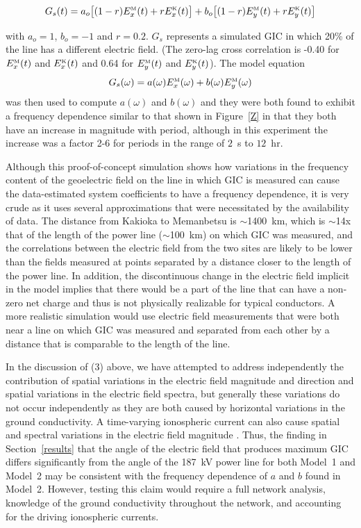 \documentclass[draft,linenumbers]{agujournal2018}
\begin{document}
\begin{equation}
  G_s(t)=a_o\big[(1-r)E^{\mbox{\tiny M}}_x(t) + rE^{\mbox{\tiny K}}_x(t)\big]+b_o\big[(1-r)E^{\mbox{\tiny M}}_y(t) + rE^{\mbox{\tiny K}}_y(t)\big]
\end{equation}

\noindent
with $a_o=1$, $b_o=-1$ and $r=0.2$. $G_s$ represents a simulated GIC in which 20\% of the line has a different electric field. (The zero-lag cross correlation is -0.40 for $E^{\mbox{\tiny M}}_x(t)$ and $E^{\mbox{\tiny K}}_x(t)$ and 0.64 for $E^{\mbox{\tiny M}}_y(t)$ and $E^{\mbox{\tiny K}}_y(t)$). The model equation
\begin{equation}
  G_s(\omega)=a(\omega)E^{\mbox{\tiny M}}_x(\omega)+b(\omega)E^{\mbox{\tiny M}}_y(\omega)
\end{equation}
\noindent
was then used to compute $a(\omega)$ and $b(\omega)$ and they were both found to exhibit a frequency dependence similar to that shown in Figure~\ref{Z} in that they both have an increase in magnitude with period, although in this experiment the increase was a factor 2-6 for periods in the range of $2$~s to $12$~hr.

Although this proof-of-concept simulation shows how variations in the frequency content of the geoelectric field on the line in which GIC is measured can cause the data-estimated system coefficients to have a frequency dependence, it is very crude as it uses several approximations that were necessitated by the availability of data. The distance from Kakioka to Memanbetsu is $\sim$1400~km, which is $\sim$14x that of the length of the power line ($\sim$100~km) on which GIC was measured, and the correlations between the electric field from the two sites are likely to be lower than the fields measured at points separated by a distance closer to the length of the power line. In addition, the discontinuous change in the electric field implicit in the model implies that there would be a part of the line that can have a non-zero net charge and thus is not physically realizable for typical conductors. A more realistic simulation would use electric field measurements that were both near a line on which GIC was measured and separated from each other by a distance that is comparable to the length of the line. 

In the discussion of (3) above, we have attempted to address independently the contribution of spatial variations in the electric field magnitude and direction and spatial variations in the electric field spectra, but generally these variations do not occur independently as they are both caused by horizontal variations in the ground conductivity. A time-varying ionospheric current can also cause spatial and spectral variations in the electric field magnitude \citep{Boteler1998}. Thus, the finding in Section~\ref{results} that the angle of the electric field that produces maximum GIC differs significantly from the angle of the 187~kV power line for both Model~1 and Model~2 may be consistent with the frequency dependence of $a$ and $b$ found in Model~2. However, testing this claim would require a full network analysis, knowledge of the ground conductivity throughout the network, and accounting for the driving ionospheric currents.
\end{document}
